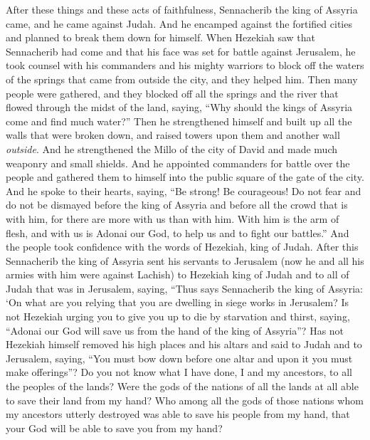 \begin{biblechapter} %
 After these things and these acts of faithfulness, Sennacherib the king of Assyria came, and he came against Judah. And he encamped against the fortified cities and planned to break them down for himself.
\verse When Hezekiah saw that Sennacherib had come and that his face was set for battle against Jerusalem,
\verse he took counsel with his commanders and his mighty warriors to block off the waters of the springs that came from outside the city, and they helped him.
\verse Then many people were gathered, and they blocked off all the springs and the river that flowed through the midst of the land, saying, “Why should the kings of Assyria come and find much water?”
\verse Then he strengthened himself and built up all the walls that were broken down, and raised towers upon them and another wall \textit{outside}. And he strengthened the Millo of the city of David and made much weaponry and small shields.
\verse And he appointed commanders for battle over the people and gathered them to himself into the public square of the gate of the city. And he spoke to their hearts, saying,
\verse “Be strong! Be courageous! Do not fear and do not be dismayed before the king of Assyria and before all the crowd that is with him, for there are more with us than with him.
\verse With him is the arm of flesh, and with us is Adonai our God, to help us and to fight our battles.” And the people took confidence with the words of Hezekiah, king of Judah.
\verse After this Sennacherib the king of Assyria sent his servants to Jerusalem (now he and all his armies with him were against Lachish) to Hezekiah king of Judah and to all of Judah that was in Jerusalem, saying,
\verse “Thus says Sennacherib the king of Assyria: ‘On what are you relying that you are dwelling in siege works in Jerusalem?
\verse Is not Hezekiah urging you to give you up to die by starvation and thirst, saying, “Adonai our God will save us from the hand of the king of Assyria”?
\verse Has not Hezekiah himself removed his high places and his altars and said to Judah and to Jerusalem, saying, “You must bow down before one altar and upon it you must make offerings”?
\verse Do you not know what I have done, I and my ancestors, to all the peoples of the lands? Were the gods of the nations of all the lands at all able to save their land from my hand?
\verse Who among all the gods of those nations whom my ancestors utterly destroyed was able to save his people from my hand, that your God will be able to save you from my hand?

\end{biblechapter}
